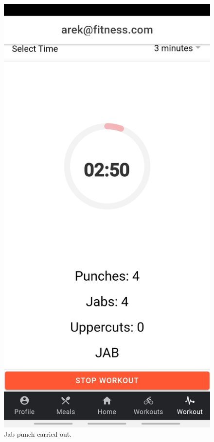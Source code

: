 \documentclass[a4paper,12pt]{report}
\begin{document}
\begin{figure}[ht]
\begin{minipage}[b]{0.5\linewidth}
    \includegraphics[width=.7\linewidth]{images/aplicationImages/jabDisplayed.jpeg} 
    \caption{Jab punch carried out.} 
    \vspace{4ex}
  \end{minipage}
  \begin{minipage}[b]{0.5\linewidth}
    \centering

\end{minipage}
\end{figure}
\end{document}

